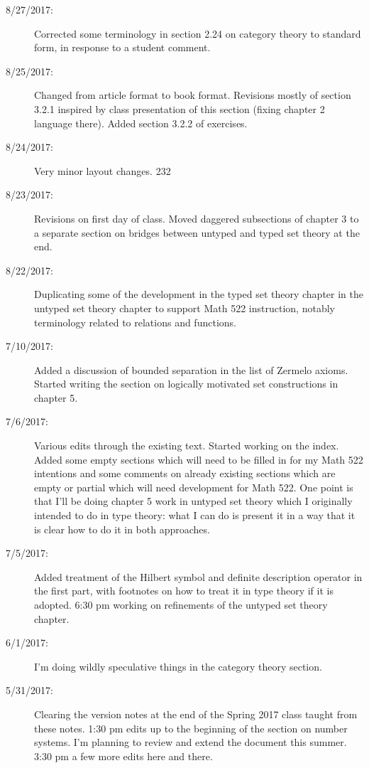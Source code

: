 \documentclass[12pt]{book}
\begin{document}
{\begin{description}
\item[8/27/2017:]  Corrected some terminology in section 2.24 on category theory to standard form, in response to a student comment.

\item[8/25/2017:]  Changed from article format to book format.  Revisions mostly of section 3.2.1 inspired by class presentation of this section (fixing chapter 2 language there).  Added section 3.2.2 of exercises.

\item[8/24/2017:]  Very minor layout changes.
232
\item[8/23/2017:]  Revisions on first day of class.  Moved daggered subsections of chapter 3 to a separate section on bridges between untyped and typed set theory at the end.

\item[8/22/2017:]  Duplicating some of the development in the typed set theory chapter in the untyped set theory chapter to support Math 522 instruction, notably terminology related to relations and functions.

\item[7/10/2017:]  Added a discussion of bounded separation in the list of Zermelo axioms.  Started writing the section on logically motivated set constructions in chapter 5.

\item[7/6/2017:]  Various edits through the existing text.  Started working on the index.  Added some empty sections which will need to be filled in for my Math 522 intentions and some comments on already existing sections which are empty or partial which will need development for Math 522.  One point is that I'll be doing chapter 5 work in untyped set theory which I originally intended to do in type theory:  what I can do is present it in a way that it is clear how to do it in both approaches.

\item[7/5/2017:]  Added treatment of the Hilbert symbol and definite description operator in the first part, with footnotes on how to treat it in type theory if it is adopted.  6:30 pm working on refinements of the untyped set theory chapter.

\item[6/1/2017:]  I'm doing wildly speculative things in the category theory section.

\item[5/31/2017:]  Clearing the version notes at the end of the Spring 2017 class taught from these notes.  1:30 pm edits up to the beginning of the section on number systems.  I'm planning to review and extend the document this summer.  3:30 pm a few more edits here and there.

\end{description}}
\end{document}
